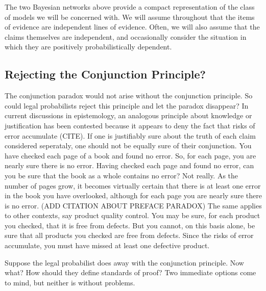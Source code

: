 \documentclass[10pt,dvipsnames,enabledeprecatedfontcommands]{scrartcl}
\begin{document}
The two Bayesian networks above provide a compact representation of the
class of models we will be concerned with. We will assume throughout
that the items of evidence are independent lines of evidence. Often, we
will also assume that the claims themselves are independent, and
occasionally consider the situation in which they are positively
probabilistically dependent.

\hypertarget{rejecting-the-conjunction-principle}{%
\subsection{Rejecting the Conjunction
Principle?}\label{rejecting-the-conjunction-principle}}

The conjunction paradox would not arise without the conjunction
principle. So could legal probabilists reject this principle and let the
paradox disappear? In current discussions in epistemology, an analogous
principle about knowledge or justification has been contested because it
appears to deny the fact that risks of error accumulate (CITE).
If one is justifiably sure about the truth of each claim considered
seperataly, one should not be equally sure of their conjunction. You
have checked each page of a book and found no error. So, for each page,
you are nearly sure there is no error. Having checked each page and
found no error, can you be sure that the book as a whole contains no
error? Not really. As the number of pages grow, it becomes virtually
certain that there is at least one error in the book you have
overlooked, although for each page you are nearly sure there is no
error. (ADD CITATION ABOUT PREFACE PARADOX) The same applies to other
contexts, say product quality control. You may be sure, for each product
you checked, that it is free from defects. But you cannot, on this basis
alone, be sure that all products you checked are free from defects.
Since the risks of error accumulate, you must have missed at least one
defective product.

Suppose the legal probabilist does away with the conjunction principle.
Now what? How should they define standards of proof? Two immediate
options come to mind, but neither is without problems.
\end{document}
